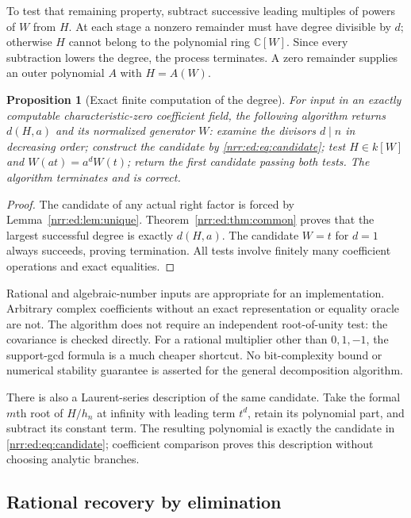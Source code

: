 \documentclass[11pt,letterpaper]{article}
\newtheorem{proposition}[theorem]{Proposition}
\theoremstyle{definition}
\theoremstyle{remark}
\newcommand{\C}{\mathbb C}
\begin{document}
To test that remaining property, subtract successive leading multiples of powers
of $W$ from $H$. At each stage a nonzero remainder must have degree divisible
by $d$; otherwise $H$ cannot belong to the polynomial ring $\C[W]$. Since every
subtraction lowers the degree, the process terminates. A zero remainder supplies
an outer polynomial $A$ with $H=A(W)$.

\begin{proposition}[Exact finite computation of the degree]
\label{nrr:ed:prop:algorithm}
For input in an exactly computable characteristic-zero coefficient field, the
following algorithm returns $d(H,a)$ and its normalized generator $W$:
examine the divisors $d\mid n$ in decreasing order; construct the candidate by
\eqref{nrr:ed:eq:candidate}; test $H\in k[W]$ and $W(at)=a^dW(t)$; return the first
candidate passing both tests. The algorithm terminates and is correct.
\end{proposition}

\begin{proof}
The candidate of any actual right factor is forced by Lemma~\ref{nrr:ed:lem:unique}.
Theorem~\ref{nrr:ed:thm:common} proves that the largest successful degree is exactly
$d(H,a)$. The candidate $W=t$ for $d=1$ always succeeds, proving termination.
All tests involve finitely many coefficient operations and exact equalities.
\end{proof}

Rational and algebraic-number inputs are appropriate for an implementation.
Arbitrary complex coefficients without an exact representation or equality oracle
are not. The algorithm does not require an independent root-of-unity test: the
covariance is checked directly. For a rational multiplier other than $0,1,-1$,
the support-gcd formula is a much cheaper shortcut. No bit-complexity bound or
numerical stability guarantee is asserted for the general decomposition algorithm.

There is also a Laurent-series description of the same candidate. Take the formal
$m$th root of $H/h_n$ at infinity with leading term $t^d$, retain its polynomial
part, and subtract its constant term. The resulting polynomial is exactly the
candidate in \eqref{nrr:ed:eq:candidate}; coefficient comparison proves this description
without choosing analytic branches.

\subsection{Rational recovery by elimination}
\end{document}

